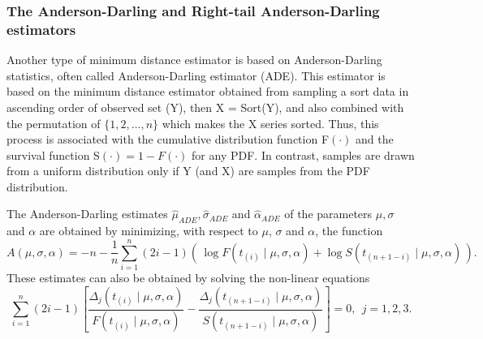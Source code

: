 \documentclass[]{interact}
\theoremstyle{plain}%
\theoremstyle{definition}
\theoremstyle{remark}
\begin{document}
\subsubsection{The Anderson-Darling and Right-tail Anderson-Darling estimators}

Another type of minimum distance estimator is based on Anderson-Darling statistics, often called Anderson-Darling estimator (ADE). This estimator is based on the minimum distance estimator obtained from sampling a sort data in ascending order of observed set (Y), then X = Sort(Y), and also combined with the permutation of $\{1, 2, \ldots, n\}$ which makes the X series sorted. Thus, this process is associated with the cumulative distribution function F$(\cdot)$ and the survival function S$(\cdot)=1-F(\cdot)$ for any PDF. In contrast, samples are drawn from a uniform distribution only if Y (and X) are samples from the PDF distribution.

The Anderson-Darling estimates $\widehat{\mu}_{ADE}, \widehat{\sigma}_{ADE}$ and $\widehat{\alpha}
_{ADE}$ of the parameters $\mu, \sigma$ and $\alpha$ are obtained
by minimizing, with respect to $\mu$, $\sigma$ and $\alpha$, the function
\begin{equation}
A(\mu,\sigma,\alpha) =-n-\frac{1}{n}\sum_{i=1}^{n}\left( 2i-1\right)
\left(\, \log F\left( t_{(i)}\mid \mu,\sigma,\alpha \right)+ \log S\left(
t_{(n+1-i)}\mid \mu,\sigma,\alpha\right) \, \right) .
\end{equation}
These estimates can also be obtained by solving the non-linear equations
\begin{equation*}
\sum_{i=1}^{n}\left( 2i-1\right) \left[ \frac{\Delta _{j}\left( t_{(i)}\mid
\mu,\sigma,\alpha \right) }{F\left( t_{(i)}\mid \mu,\sigma,\alpha \right) }-
\frac{\Delta_{j}\left( t_{(n+1-i)}\mid \mu,\sigma,\alpha \right) }{S\left( t_{(n+1-i)}\mid \mu,\sigma,\alpha \right) }\right] =0, \ \ j=1,2,3.
\end{equation*}
\end{document}
